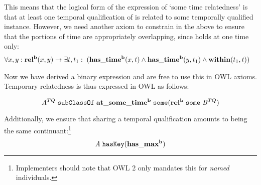 This means that the logical form of the expression of `some time relatedness' is that
at least one temporal qualification of  is related to some temporally
qualified  instance.
However, we need another axiom to constrain  in the above to ensure that the
portions of time are appropriately overlapping, since  holds at one time
only:
\begin{equation}
\begin{split}
\forall x,y:\;& \mathrm{\mathbf{rel^b}}(x,y) \rightarrow \exists t,t_1:\;
(\mathrm{\mathbf{has\_time^b}}(x, t) \wedge \mathrm{\mathbf{has\_time^b}}(y,t_1) \wedge \mathrm{\mathbf{within}}(t_1,t))
\end{split}
\end{equation}

Now we have derived a binary expression  and are free to use this in OWL
axioms. Temporary relatedness is thus expressed in OWL as follows:

\begin{equation}
\mathit{A}^{TQ}\;\mathtt{subClassOf}\;\mathrm{\mathbf{at\_some\_time^b}}\;\mathtt{some
(}\mathrm{\mathbf{rel^b}}\;\mathtt{some}\;\mathit{B}^{TQ})
\label{eq:tqc:temp}
\end{equation}

Additionally, we ensure that sharing a temporal qualification amounts to being
the same continuant:\footnote{Implementers should note that OWL 2 only mandates
this for \emph{named} individuals.}
\begin{equation}
\mathit{A}\;\mathtt{hasKey}(\mathrm{\mathbf{has\_max^b}})
\end{equation}




